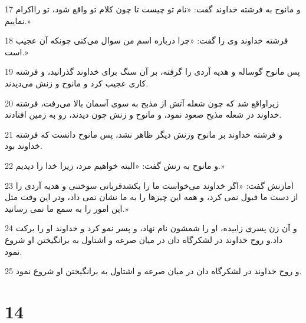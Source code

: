 \par 17 و مانوح به فرشته خداوند گفت: «نام تو چیست تا چون کلام تو واقع شود، تو رااکرام نماییم.»
\par 18 فرشته خداوند وی را گفت: «چرا درباره اسم من سوال می‌کنی چونکه آن عجیب است.»
\par 19 پس مانوح گوساله و هدیه آردی را گرفته، بر آن سنگ برای خداوند گذرانید، و فرشته کاری عجیب کرد و مانوح و زنش می‌دیدند.
\par 20 زیراواقع شد که چون شعله آتش از مذبح به سوی آسمان بالا می‌رفت، فرشته خداوند در شعله مذبح صعود نمود، و مانوح و زنش چون دیدند، رو به زمین افتادند.
\par 21 و فرشته خداوند بر مانوح وزنش دیگر ظاهر نشد، پس مانوح دانست که فرشته خداوند بود.
\par 22 و مانوح به زنش گفت: «البته خواهیم مرد، زیرا خدا را دیدیم.»
\par 23 امازنش گفت: «اگر خداوند می‌خواست ما را بکشدقربانی سوختنی و هدیه آردی را از دست ما قبول نمی کرد، و همه این چیزها را به ما نشان نمی داد، ودر این وقت مثل این امور را به سمع ما نمی رسانید.»
\par 24 و آن زن پسری زاییده، او را شمشون نام نهاد، و پسر نمو کرد و خداوند او را برکت داد.و روح خداوند در لشکرگاه دان در میان صرعه و اشتاول به برانگیختن او شروع نمود.
\par 25 و روح خداوند در لشکرگاه دان در میان صرعه و اشتاول به برانگیختن او شروع نمود.
 
\chapter{14}

